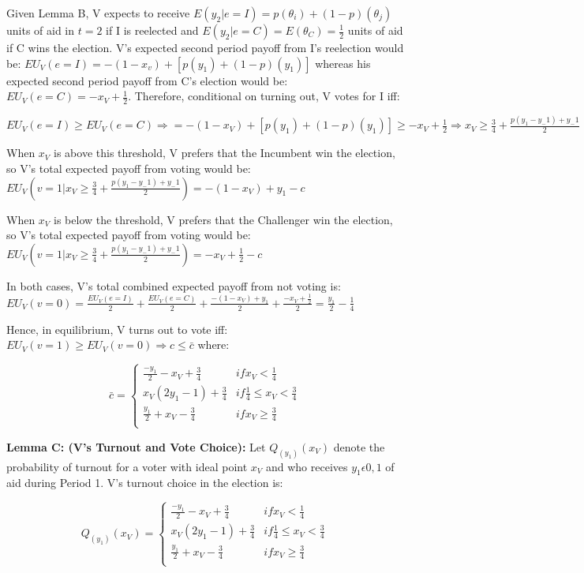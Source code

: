 \documentclass[12pt]{paper}
\begin{document}
Given Lemma B, V expects to receive $E(y_2 | e=I)=p(\theta_i )+(1-p)(\theta_j)$ units of aid in $t=2$ if I is reelected and $E(y_2 |e=C)=E(\theta_C )=\frac{1}{2}$ units of aid if C wins the election.  V’s expected second period payoff from I’s reelection would be: $EU_V (e=I) = -(1 - x_v ) + [p(y_1 ) + (1 - p)(y_1 )]$ whereas his expected second period payoff from C’s election would be: $EU_V (e=C) = - x_V + \frac{1}{2}$. Therefore, conditional on turning out, V votes for I iff: 

$EU_V (e=I) \geq EU_V (e=C) \Rightarrow = -(1 - x_V ) + [p(y_1 ) + (1 - p)(y_1 )] \geq - x_V + \frac{1}{2} \Rightarrow x_V \geq \frac{3}{4} + \frac{p(y_1 - y_-1 ) + y_-1}{2}$

When $x_V$ is above this threshold, V prefers that the Incumbent win the election, so V’s total expected payoff from voting would be:
$ EU_V (v=1 | x_V \geq \frac{3}{4} + \frac{p(y_1 - y_-1 ) + y_-1}{2}) = - (1 - x_V ) + y_1 - c$

When $x_V$ is below the threshold, V prefers that the Challenger win the election, so V’s total expected payoff from voting would be:
$ EU_V (v=1 | x_V \geq \frac{3}{4} + \frac{p(y_1 - y_-1 ) + y_-1}{2}) = -x_V + \frac{1}{2} - c$

In both cases, V’s total combined expected payoff from not voting is:
$ EU_V (v=0) = \frac{EU_V (e=I)}{2} + \frac{EU_V (e=C)}{2} + \frac{- (1 - x_V ) + y_1}{2} + \frac{-x_V + \frac{1}{2}}{2} = \frac{y_1}{2} - \frac{1}{4}$

Hence, in equilibrium, V turns out to vote iff: $EU_V (v=1) \geq EU_V (v=0) \Rightarrow c \leq \bar{c}$ where:

\begin{equation}
\bar{c} =
\begin{cases}
\frac{-y_1}{2} - x_V + \frac{3}{4} & if x_V < \frac{1}{4}\\    
x_V (2y_1 - 1) + \frac{3}{4}     & if \frac{1}{4} \leq x_V < \frac{3}{4}  \\
\frac{y_1}{2} + x_V - \frac{3}{4}     & if x_V \geq \frac{3}{4}  \\
\end{cases}
\end{equation}

\textbf{Lemma C: (V’s Turnout and Vote Choice):} Let $Q_(y_1 )(x_V )$ denote the probability of turnout for a voter with ideal point $x_V$ and who receives $y_1 \epsilon {0,1}$ of aid during Period 1. V’s turnout choice in the election is:

\begin{equation}
Q_(y_1 )(x_V ) =
\begin{cases}
\frac{-y_1}{2} - x_V + \frac{3}{4} & if x_V < \frac{1}{4}\\    
x_V (2y_1 - 1) + \frac{3}{4}     & if \frac{1}{4} \leq x_V < \frac{3}{4}  \\
\frac{y_1}{2} + x_V - \frac{3}{4}     & if x_V \geq \frac{3}{4}  \\
\end{cases}
\end{equation}
\end{document}
